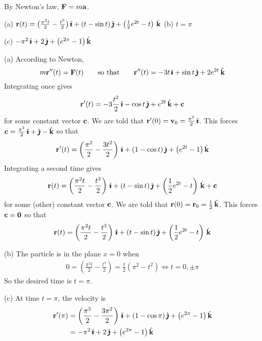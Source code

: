 \begin{hint} 
By Newton's law, $\mathbf{F}=m\mathbf{a}$.
\end{hint}

\begin{answer} 
(a) $\mathbf{r}(t) = \big(\frac{\pi^2 t}{2}-\frac{t^3}{2}\big)\,\hat{\pmb{\imath}} + 
              (t- \sin t)\,\hat{\pmb{\jmath}} + \left(\frac{1}{2}e^{2t}-t\right)\,\hat{\mathbf{k}}$ \qquad
(b) $t=\pi$ 

(c) $-\pi^2\,\hat{\pmb{\imath}} +2\,\hat{\pmb{\jmath}} + \big(e^{2\pi}-1\big)\,\hat{\mathbf{k}}$
\end{answer}

\begin{solution} (a)
According to Newton,
\begin{equation*}
m\mathbf{r}''(t) = \mathbf{F}(t)\qquad\text{so that}\qquad
\mathbf{r}''(t) = -3t\,\hat{\pmb{\imath}} + \sin t\,\hat{\pmb{\jmath}} + 2e^{2t}\,\hat{\mathbf{k}}
\end{equation*}
Integrating once gives
\begin{align*}
\mathbf{r}'(t) = -3\frac{t^2}{2}\,\hat{\pmb{\imath}} - \cos t\,\hat{\pmb{\jmath}} + e^{2t}\,\hat{\mathbf{k}} +\mathbf{c}
\end{align*}
for some constant vector $\mathbf{c}$. We are told that $\mathbf{r}'(0)=\mathbf{v}_0
=\frac{\pi^2}{2}\,\hat{\pmb{\imath}}$. This forces $\mathbf{c}=\frac{\pi^2}{2}\,\hat{\pmb{\imath}}+\hat{\pmb{\jmath}}-\hat{\mathbf{k}}$
so that
\begin{align*}
\mathbf{r}'(t) = \left(\frac{\pi^2}{2}-\frac{3t^2}{2}\right)\,\hat{\pmb{\imath}} +(1- \cos t)\,\hat{\pmb{\jmath}} + \big(e^{2t}-1\big)\,\hat{\mathbf{k}} 
\end{align*}
Integrating a second time gives
\begin{align*}
\mathbf{r}(t) = \left(\frac{\pi^2 t}{2}-\frac{t^3}{2}\right)\,\hat{\pmb{\imath}} +(t- \sin t)\,\hat{\pmb{\jmath}} 
 + \left(\frac{1}{2}e^{2t}-t\right)\,\hat{\mathbf{k}}  + \mathbf{c}
\end{align*}
for some (other) constant vector $\mathbf{c}$.  We are told that $\mathbf{r}(0)=\mathbf{r}_0
=\frac{1}{2}\,\hat{\mathbf{k}}$. This forces $\mathbf{c}=\mathbf{0}$
so that
\begin{align*}
\mathbf{r}(t) = \left(\frac{\pi^2 t}{2}-\frac{t^3}{2}\right)\,\hat{\pmb{\imath}} +(t- \sin t)\,\hat{\pmb{\jmath}} 
 + \left(\frac{1}{2}e^{2t}-t\right)\,\hat{\mathbf{k}} 
\end{align*}

(b) The particle is in the plane $x=0$ when
\begin{align*}
0=\left(\frac{\pi^2 t}{2}-\frac{t^3}{2}\right)
 =\frac{t}{2}(\pi^2-t^2) 
\iff t=0, \pm\pi
\end{align*}
So the desired time is $t=\pi$.

(c) At time $t=\pi$, the velocity is
\begin{align*}
\mathbf{r}'(\pi) 
&= \left(\frac{\pi^2}{2}-\frac{3\pi^2}{2}\right)\,\hat{\pmb{\imath}} +(1- \cos\pi)\,\hat{\pmb{\jmath}} +                 \big(e^{2\pi}-1\big)\,\hat{\mathbf{k}} \\
&= -\pi^2\,\hat{\pmb{\imath}} +2\,\hat{\pmb{\jmath}} + \big(e^{2\pi}-1\big)\,\hat{\mathbf{k}}
\end{align*}

\end{solution}
